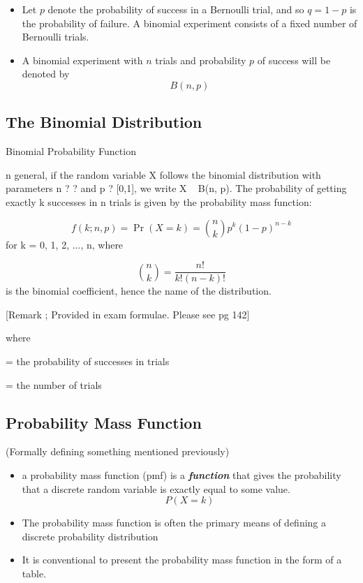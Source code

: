 \documentclass[a4paper,12pt]{article}
\begin{document}


\begin{itemize}
	\item
	Let $p$ denote the probability of success in a Bernoulli trial, and so $q = 1 - p$ is the probability of failure.
	A binomial experiment consists of a fixed number of Bernoulli trials. \item A binomial experiment with $n$ trials and
	probability $p$ of success will be denoted by
	\[B(n, p)\]
\end{itemize}




\subsection{The Binomial Distribution}



Binomial Probability Function

n general, if the random variable X follows the binomial distribution with parameters n ? ? and p ? [0,1], we write X ~ B(n, p). The probability of getting exactly k successes in n trials is given by the probability mass function:

\[f(k;n,p)=\Pr(X=k)={\binom {n}{k}}p^{k}(1-p)^{n-k}\]
for k = 0, 1, 2, ..., n, where

\[{\binom {n}{k}}={\frac {n!}{k!(n-k)!}}\]
is the binomial coefficient, hence the name of the distribution. 

[Remark ; Provided in exam formulae. Please see pg 142]



where

= the probability of   successes in   trials

= the number of trials


\subsection{Probability Mass Function}
(Formally defining something mentioned previously)
\begin{itemize} \item a probability mass function (pmf) is a \textbf{\emph{function}}
	that gives the probability that a discrete random variable is exactly equal to some
	value.
	\[P(X=k)\]
	\item The probability mass function is often the primary means of defining a discrete
	probability distribution
	\item It is conventional to present the probability mass function in the form of a table.
\end{itemize}
\end{document}

